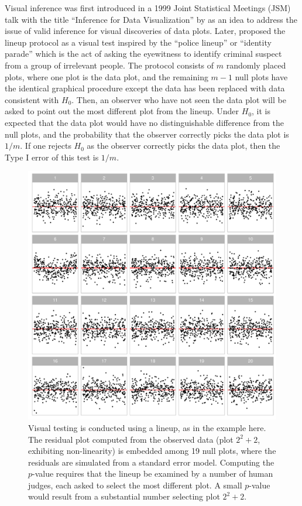 \documentclass[]{interact}
\theoremstyle{plain}%
\theoremstyle{definition}
\theoremstyle{remark}
\begin{document}
Visual inference was first introduced in a 1999 Joint Statistical
Meetings (JSM) talk with the title ``Inference for Data Visualization''
by \citet{buja_inference_1999} as an idea to address the issue of valid
inference for visual discoveries of data plots. Later,
\citet{buja_statistical_2009} proposed the lineup protocol as a visual
test inspired by the ``police lineup'' or ``identity parade'' which is
the act of asking the eyewitness to identify criminal suspect from a
group of irrelevant people. The protocol consists of \(m\) randomly
placed plots, where one plot is the data plot, and the remaining
\(m - 1\) null plots have the identical graphical procedure except the
data has been replaced with data consistent with \(H_0\). Then, an
observer who have not seen the data plot will be asked to point out the
most different plot from the lineup. Under \(H_0\), it is expected that
the data plot would have no distinguishable difference from the null
plots, and the probability that the observer correctly picks the data
plot is \(1/m\). If one rejects \(H_0\) as the observer correctly picks
the data plot, then the Type I error of this test is \(1/m\).

\begin{figure}

{\centering \includegraphics[width=1\linewidth]{paper_comparison_files/figure-latex/first-example-lineup-1} 

}

\caption{Visual testing is conducted using a lineup, as in the example here. The residual plot computed from the observed data (plot $2^2 + 2$, exhibiting non-linearity) is embedded among 19 null plots, where the residuals are simulated from a standard error model. Computing the $p$-value requires that the lineup be examined by a number of human judges, each asked to select the most different plot. A small $p$-value would result from a substantial number selecting plot $2^2 + 2$.}\label{fig:first-example-lineup}
\end{figure}
\end{document}
